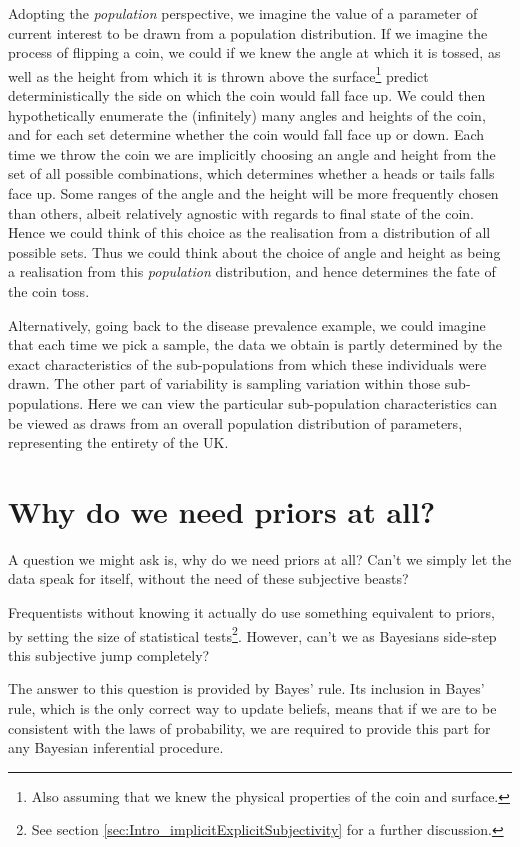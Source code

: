 \documentclass[11pt,fullpage]{book}
\begin{document}
Adopting the \textit{population} perspective, we imagine the value of a parameter of current interest to be drawn from a population distribution. If we imagine the process of flipping a coin, we could if we knew the angle at which it is tossed, as well as the height from which it is thrown above the surface\footnote{Also assuming that we knew the physical properties of the coin and surface.} predict deterministically the side on which the coin would fall face up. We could then hypothetically enumerate the (infinitely) many angles and heights of the coin, and for each set determine whether the coin would fall face up or down. Each time we throw the coin we are implicitly choosing an angle and height from the set of all possible combinations, which determines whether a heads or tails falls face up. Some ranges of the angle and the height will be more frequently chosen than others, albeit relatively agnostic with regards to final state of the coin.  Hence we could think of this choice as the realisation from a distribution of all possible sets. Thus we could think about the choice of angle and height as being a realisation from this \textit{population} distribution, and hence determines the fate of the coin toss.

Alternatively, going back to the disease prevalence example, we could imagine that each time we pick a sample, the data we obtain is partly determined by the exact characteristics of the sub-populations from which these individuals were drawn. The other part of variability is sampling variation within those sub-populations. Here we can view the particular sub-population characteristics can be viewed as draws from an overall population distribution of parameters, representing the entirety of the UK. 

\section{Why do we need priors at all?}
A question we might ask is, why do we need priors at all? Can't we simply let the data speak for itself, without the need of these subjective beasts? 

Frequentists without knowing it actually do use something equivalent to priors, by setting the size of statistical tests\footnote{See section \ref{sec:Intro_implicitExplicitSubjectivity} for a further discussion.}. However, can't we as Bayesians side-step this subjective jump completely?

The answer to this question is provided by Bayes' rule. Its inclusion in Bayes' rule, which is the only correct way to update beliefs, means that if we are to be consistent with the laws of probability, we are required to provide this part for any Bayesian inferential procedure. 
\end{document}

